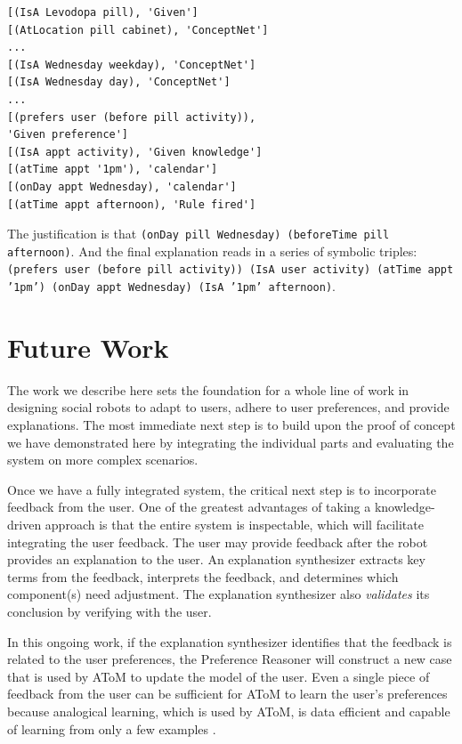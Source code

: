 \documentclass[letterpaper]{article} %
\begin{document}
\small{
\begin{verbatim}
[(IsA Levodopa pill), 'Given']
[(AtLocation pill cabinet), 'ConceptNet']
...
[(IsA Wednesday weekday), 'ConceptNet']
[(IsA Wednesday day), 'ConceptNet']
...
[(prefers user (before pill activity)),
'Given preference']
[(IsA appt activity), 'Given knowledge']
[(atTime appt '1pm'), 'calendar']
[(onDay appt Wednesday), 'calendar']
[(atTime appt afternoon), 'Rule fired']
\end{verbatim}}  The justification is that \texttt{(onDay pill Wednesday) (beforeTime pill
afternoon)}.  And the final explanation reads in a series of symbolic
triples: \texttt{(prefers user (before pill activity)) (IsA user activity) (atTime appt '1pm') (onDay appt Wednesday) (IsA '1pm' afternoon)}.

\vspace{-3.04mm}
\section{Future Work}
The work we describe here sets the foundation for a whole line of work in
designing social robots to adapt to users, adhere to user preferences, and
provide explanations.  The most immediate next step is to build upon the
proof of concept we have demonstrated here by integrating the individual
parts and evaluating the system on more complex scenarios.

Once we have a fully integrated system, the critical next step is to
incorporate feedback from the user.
One of the greatest advantages of taking a knowledge-driven approach is
that the entire system is inspectable, which will facilitate integrating
the user feedback.
The user may provide feedback after the robot provides an explanation to
the user.  An explanation synthesizer extracts key terms from the
feedback, interprets the feedback, and determines which component(s)
need adjustment.  The explanation synthesizer also \emph{validates} its
conclusion by verifying with the user.

In this ongoing work, if the explanation synthesizer identifies that the feedback is related
to the user preferences, the Preference Reasoner will construct a new
case that is used by AToM to update the model of the user.  Even a single
piece of feedback from the user can be sufficient for AToM to learn the
user's preferences because analogical learning, which is used by AToM, is
data efficient and capable of learning from only a few examples
\cite{chen2019human,wilson2019analogical}.
\end{document}
